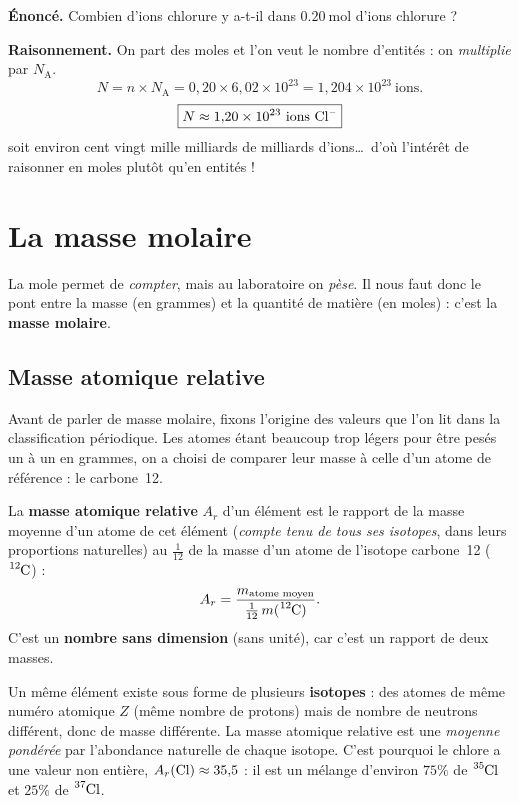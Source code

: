\documentclass[11pt,a4paper]{article}
\newcommand{\NA}{N_{\!\text{A}}}
\begin{document}
\begin{exemple}
\textbf{Énoncé.} Combien d'ions chlorure  y a-t-il dans $\SI{0.20}{\mole}$ d'ions chlorure ?

\smallskip
\textbf{Raisonnement.} On part des moles et l'on veut le nombre d'entités : on \emph{multiplie} par $\NA$.
\[ N = n\times\NA = 0{,}20 \times 6{,}02\times10^{23} = 1{,}204\times10^{23}\ \text{ions}. \]
\[ \boxed{N \approx 1{,}20\times10^{23}\ \text{ions \ce{Cl-}}} \]
soit environ cent vingt mille milliards de milliards d'ions\ldots\ d'où l'intérêt de raisonner en
moles plutôt qu'en entités !
\end{exemple}

\section{La masse molaire}
La mole permet de \emph{compter}, mais au laboratoire on \emph{pèse}. Il nous faut donc le pont
entre la masse (en grammes) et la quantité de matière (en moles) : c'est la \textbf{masse molaire}.

\subsection{Masse atomique relative}

Avant de parler de masse molaire, fixons l'origine des valeurs que l'on lit dans la classification
périodique. Les atomes étant beaucoup trop légers pour être pesés un à un en grammes, on a choisi de
comparer leur masse à celle d'un atome de référence : le carbone~12.

\begin{definition}
La \textbf{masse atomique relative} $A_r$ d'un élément est le rapport de la masse moyenne d'un atome
de cet élément (\emph{compte tenu de tous ses isotopes}, dans leurs proportions naturelles) au
$\frac{1}{12}$ de la masse d'un atome de l'isotope carbone~12 ($\ce{^{12}C}$) :
\[ A_r = \frac{m_{\text{atome moyen}}}{\frac{1}{12}\,m(\ce{^{12}C})}. \]
C'est un \textbf{nombre sans dimension} (sans unité), car c'est un rapport de deux masses.
\end{definition}

\begin{remarque}
Un même élément existe sous forme de plusieurs \textbf{isotopes} : des atomes de même numéro
atomique $Z$ (même nombre de protons) mais de nombre de neutrons différent, donc de masse différente.
La masse atomique relative est une \emph{moyenne pondérée} par l'abondance naturelle de chaque
isotope. C'est pourquoi le chlore a une valeur non entière, $A_r(\ce{Cl})\approx 35{,}5$ : il est un
mélange d'environ $75\%$ de $\ce{^{35}Cl}$ et $25\%$ de $\ce{^{37}Cl}$.
\end{remarque}
\end{document}
